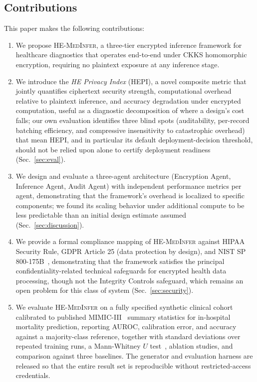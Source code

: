 \documentclass[journal,compsoc]{IEEEtran}
\newcommand{\HEPI}{\textsc{HEPI}}          %
\newcommand{\framework}{\textsc{HE-MedInfer}}
\begin{document}
\subsection*{Contributions}

This paper makes the following contributions:

\begin{enumerate}
  \item We propose \framework{}, a three-tier encrypted inference framework
    for healthcare diagnostics that operates end-to-end under CKKS homomorphic
    encryption, requiring no plaintext exposure at any inference stage.

  \item We introduce the \emph{HE Privacy Index} (\HEPI{}), a novel composite
    metric that jointly quantifies ciphertext security strength, computational
    overhead relative to plaintext inference, and accuracy degradation under
    encrypted computation, useful as a diagnostic decomposition of where a
    design's cost falls; our own evaluation identifies three blind spots
    (auditability, per-record batching efficiency, and compressive
    insensitivity to catastrophic overhead) that mean \HEPI{}, and in
    particular its default deployment-decision threshold, should not be
    relied upon alone to certify deployment readiness (Sec.~\ref{sec:eval}).

  \item We design and evaluate a three-agent architecture (Encryption Agent,
    Inference Agent, Audit Agent) with independent performance metrics per
    agent, demonstrating that the framework's overhead is localized to
    specific components; we found its scaling behavior under additional
    compute to be less predictable than an initial design estimate assumed
    (Sec.~\ref{sec:discussion}).

  \item We provide a formal compliance mapping of \framework{} against HIPAA
    Security Rule, GDPR Article 25 (data protection by design), and NIST
    SP 800-175B~\cite{nist2020sp800175b}, demonstrating that the framework satisfies the principal
    confidentiality-related technical safeguards for encrypted health data
    processing, though not the Integrity Controls safeguard, which remains
    an open problem for this class of system (Sec.~\ref{sec:security}).

  \item We evaluate \framework{} on a fully specified synthetic clinical
    cohort calibrated to published MIMIC-III~\cite{johnson2016mimic} summary
    statistics for in-hospital mortality prediction, reporting AUROC,
    calibration error, and accuracy against a majority-class reference,
    together with standard deviations over repeated training runs, a Mann-Whitney $U$
    test~\cite{mann1947test}, ablation studies, and comparison against three
    baselines. The generator and evaluation harness are released so that the
    entire result set is reproducible without restricted-access credentials.
\end{enumerate}
\end{document}
